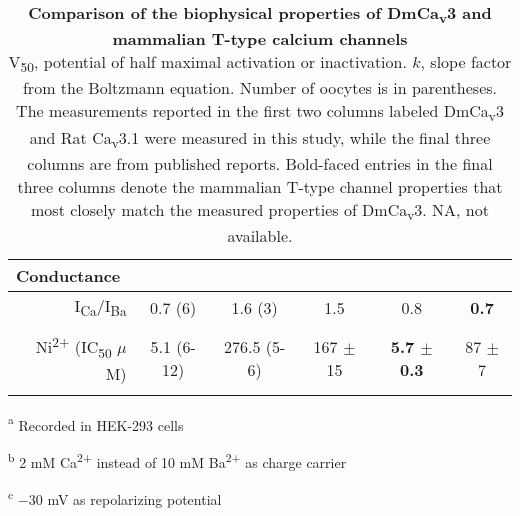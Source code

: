 {\begin{table}[ht!]
\begin{center}
\begin{threeparttable}
\begin{tabular}{@{}rccccc@{}}
\multicolumn{1}{l}{{\bf Conductance}} &  &  &  &  &  \\ \midrule \addlinespace
I\textsubscript{Ca}/I\textsubscript{Ba} & 0.7 (6) & 1.6 (3) & 1.5\cite{shcheglovitov:2007aa} & 0.8\cite{shcheglovitov:2007aa} & {\bf 0.7\cite{shcheglovitov:2007aa}} \\ \addlinespace \addlinespace
\multicolumn{1}{l}{{\bf Pharmacology}} &  &  &  &  &  \\ \midrule \addlinespace
Ni\textsuperscript{2+} (IC\textsubscript{50} $\mu$M) & 5.1 (6-12) & 276.5 (5-6) & 167 $\pm$ 15\cite{lee:1999ab}\tnote{c} & {\bf 5.7 $\pm$ 0.3\cite{lee:1999ab}\tnote{c}} & 87 $\pm$ 7\cite{lee:1999ab}\tnote{c} \\ \addlinespace 
\end{tabular}
    \begin{tablenotes}
        \item[\textsuperscript{a}] Recorded in HEK-293 cells
        \item[\textsuperscript{b}] 2 mM Ca\textsuperscript{2+} instead of 10 mM Ba\textsuperscript{2+} as charge carrier
        \item[\textsuperscript{c}] $-$30 mV as repolarizing potential
    \end{tablenotes}
\end{threeparttable}
\end{center}
\caption{
{\bf Comparison of the biophysical properties of DmCa\textsubscript{v}3 and mammalian T-type calcium channels}
\\
V\textsubscript{50}, potential of half maximal activation or inactivation.
$k$, slope factor from the Boltzmann equation.
Number of oocytes is in parentheses.
The measurements reported in the first two columns labeled DmCa\textsubscript{v}3 and Rat Ca\textsubscript{v}3.1 were measured in this study, while the final three columns are from published reports.
Bold-faced entries in the final three columns denote the mammalian T-type channel properties that most closely match the measured properties of DmCa\textsubscript{v}3.
NA, not available.}
\label{tab:1}
\end{table}
}